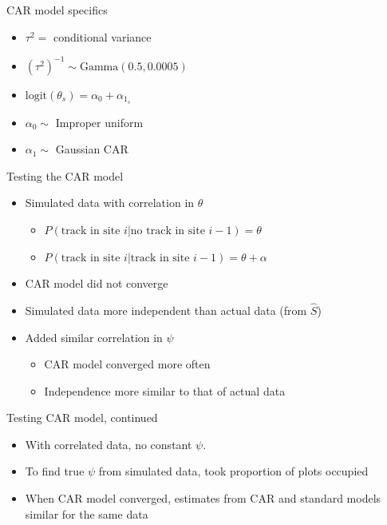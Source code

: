 \documentclass{beamer}
\begin{document}
\begin{frame}{CAR model specifics}
	\begin{itemize}
		\item $\tau^2 =$ conditional variance
		\item $(\tau^2)^{-1} \sim \text{Gamma}(0.5,0.0005)$
		\item $\text{logit}(\theta_s)=\alpha_0+\alpha_{1_s}$
		\item $\alpha_0 \sim$ Improper uniform
		\item $\alpha_1 \sim$ Gaussian CAR
	\end{itemize}
\end{frame}

\begin{frame}{Testing the CAR model}
	\begin{itemize}
		\item Simulated data with correlation in $\theta$
		\begin{itemize}
			\item $P(\text{track in site }i|\text{no track in site }i-1)=\theta$
			\item $P(\text{track in site }i|\text{track in site }i-1)=\theta+
			\alpha$
		\end{itemize}
		\item CAR model did not converge
		\item Simulated data more independent than actual data (from $\hat{S}$)
		\item Added similar correlation in $\psi$
		\begin{itemize}
			\item CAR model converged more often
			\item Independence more similar to that of actual data
		\end{itemize}
	\end{itemize}
\end{frame}

\begin{frame}{Testing CAR model, continued}
	\begin{itemize}
		\item With correlated data, no constant $\psi$.
		\item To find true $\psi$ from simulated data, took proportion of plots
		occupied
		\item When CAR model converged, estimates from CAR and standard models
		similar for the same data
	\end{itemize}
\end{frame}
\end{document}
